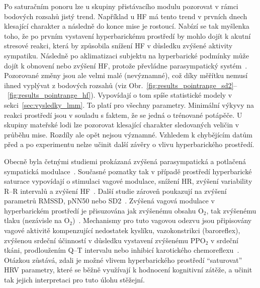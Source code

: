 Po saturačním ponoru lze u skupiny přistávacího modulu pozorovat v rámci
bodových rozsahů jistý trend. Například u HF má tento trend v prvních dnech
klesající charakter a následně do konce mise je rostoucí. Nabízí se tak myšlenka
toho, že po prvním vystavení hyperbarickému prostředí by mohlo dojít k akutní
stresové reakci, která by způsobila snížení HF v důsledku zvýšené aktivity
sympatiku. Následně po aklimatizaci subjektu na hyperbarické podmínky může dojít
k obnovení nebo zvýšení HF, protože převládne parasympatický
systém~\cite{Lafere2021,Lund1999,Lund2000,Ma2022}. Pozorované změny jsou ale
velmi malé (nevýznamné), což díky měřítku nemusí ihned vyplývat z bodových
rozsahů (viz
Obr.~\ref{fig:results_pointrange_sd2}--~\ref{fig:results_pointrange_hf}).
Vypovídají o tom spíše statistické modely v sekci~\ref{sec:vysledky_lmm}. To
platí pro všechny parametry. Minimální výkyvy na reakci prostředí jsou v souladu
s faktem, že se jedná o trénované potápěče. U skupiny mateřské lodi lze
pozorovat klesající charakter sledovaných veličin v průběhu mise. Rozdíly ale
opět nejsou významné. Vzhledem k chybějícím datům před a po experimentu nelze
učinit další závěry o vlivu hyperbarického prostředí.

Obecně byla četnými studiemi prokázaná zvýšená parasympatická a potlačená
sympatická modulace~\cite{Lafere2021,Lund1999,Lund2000,Ma2022}. Současné
poznatky tak v případě prostředí hyperbarické saturace vypovídají o stimulaci
vagové modulace, snížení HR, zvýšení variability R--R intervalů a zvýšení
HF~\cite{Goyal2023}. Další studie zároveň poukazují na zvýšení parametrů RMSSD,
pNN50 nebo SD2~\cite{koutnik2021neemo,Lafere2021,Lund2000,Ma2022}. Zvýšená
vagová modulace v hyperbarickém prostředí je přisuzována jak zvýšenému obsahu
$\text{O}_2$, tak zvýšenému tlaku (nezávisle na
$\text{O}_2$)~\cite{koutnik2021neemo,Lund1999}. Mechanismy pro tuto vagovou
odezvu jsou připisovány vagové aktivitě kompenzující nedostatek kyslíku,
vazokonstrikci (baroreflex), zvýšenou srdeční účinností v důsledku vystavení
zvýšenému $\text{PPO}_2$ v srdeční tkáni, prodloužením Q--T intervalu nebo
inhibicí karotického chemoreflexu~\cite{koutnik2021neemo,Goyal2023,Paula2019}.
Otázkou zůstává, zdali je možné vlivem hyperbarického prostředí
\enquote{saturovat} HRV parametry, které se běžně využívají k hodnocení
kognitivní zátěže, a učinit tak jejich interpretaci pro tuto úlohu stěžejní.

